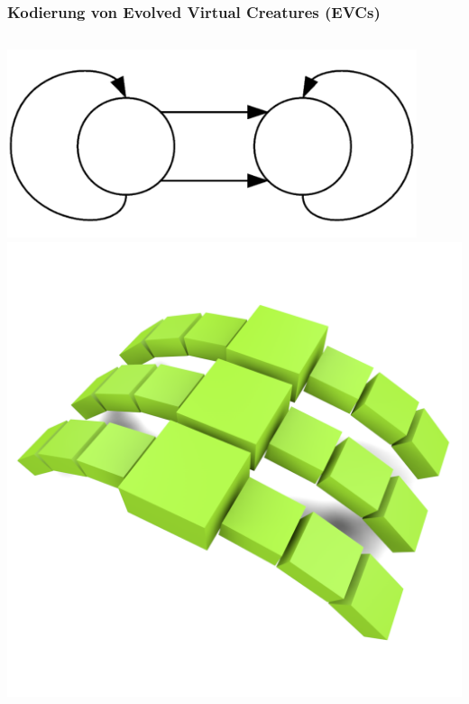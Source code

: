 \documentclass{beamer}
\begin{document}
\begin{frame}
	\frametitle{Kodierung von Evolved Virtual Creatures (EVCs)}
	\begin{columns}[c]
		\centering
		\includegraphics[width=0.9\textwidth]{img/g4.png} \pause
		\centering
		\includegraphics[width=\textwidth]{img/4.png}
	\end{columns}
\end{frame}

\end{document}
